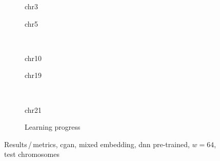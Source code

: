 \begin{figure}[p] %
    \begin{subfigure}{0.45\textwidth}
        \scriptsize
        \caption{chr3}
    \end{subfigure} \hfill
    \begin{subfigure}{0.45\textwidth}
        \scriptsize
        \caption{chr5}
    \end{subfigure}\\[5mm]
    \begin{subfigure}{0.45\textwidth}
        \scriptsize
        \caption{chr10}
    \end{subfigure}\hfill
    \begin{subfigure}{0.45\textwidth}
        \scriptsize
        \caption{chr19}
    \end{subfigure}\\[3mm]
    \centering
    \begin{subfigure}{0.45\textwidth}
        \scriptsize
        \caption{chr21}
    \end{subfigure} \hfill
    \begin{subfigure}{0.45\textwidth}
        \scriptsize
        \caption{Learning progress} \label{fig:results:GAN64_pretrained_mixed_lossEpochs}
    \end{subfigure}
    \caption{Results\,/\,metrics, \acrshort{cgan}, mixed embedding, \acrshort{dnn} pre-trained, $w=64$, test chromosomes}   \label{fig:results:GAN64_pretrained_mixed_pearson}
\end{figure}
